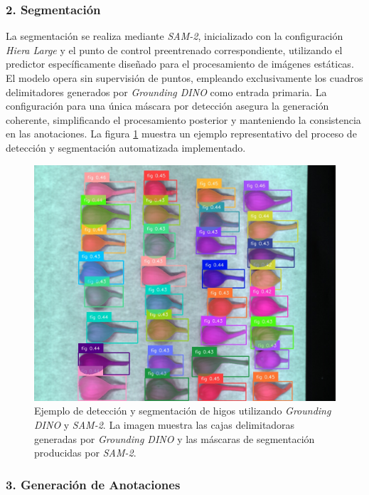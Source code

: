 \subsubsection{2. Segmentación}

La segmentación se realiza mediante \emph{SAM-2}, inicializado con la configuración \emph{Hiera Large} y el punto de control preentrenado correspondiente, utilizando el predictor específicamente diseñado para el procesamiento de imágenes estáticas. El modelo opera sin supervisión de puntos, empleando exclusivamente los cuadros delimitadores generados por \emph{Grounding DINO} como entrada primaria. La configuración para una única máscara por detección asegura la generación coherente, simplificando el procesamiento posterior y manteniendo la consistencia en las anotaciones. La figura \ref{fig:dino_sam} muestra un ejemplo representativo del proceso de detección y segmentación automatizada implementado.

\begin{figure}[ht]
\centering
\includegraphics[width=\textwidth]{images/dino_sam.jpg}
\caption{Ejemplo de detección y segmentación de higos utilizando \emph{Grounding DINO} y \emph{SAM-2}. La imagen muestra las cajas delimitadoras generadas por \emph{Grounding DINO} y las máscaras de segmentación producidas por \emph{SAM-2}.}
\label{fig:dino_sam}
\end{figure}

\subsubsection{3. Generación de Anotaciones}

